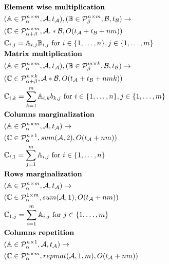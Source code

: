 \begin{figure}
\begin{framed}
\begin{align*}
&\text{{\bf Element wise multiplication}}\\
&(\mathbb{A} \in \mathcal{P}^{n \times m}_\alpha, \mathcal{A}, t_\mathcal{A}), (\mathbb{B} \in \mathcal{P}^{n \times m}_\beta, \mathcal{B}, t_\mathcal{B}) \rightarrow \\ 
&(\mathbb{C} \in \mathcal{P}^{n \times m}_{\alpha + \beta}, \mathcal{A} .* \mathcal{B}, O(t_\mathcal{A} + t_\mathcal{B} + nm)) \\
&\mathbb{C}_{i,j} = \mathbb{A}_{i,j}\mathbb{B}_{i, j} \text{ for } i \in \{1, \dots, n\}, j \in \{1, \dots, m\} \\
&\text{{\bf Matrix multiplication}}\\
&(\mathbb{A} \in \mathcal{P}^{n \times m}_\alpha, \mathcal{A}, t_\mathcal{A}), (\mathbb{B} \in \mathcal{P}^{m \times k}_\beta, \mathcal{B}, t_\mathcal{B}) \rightarrow \\ 
&(\mathbb{C} \in \mathcal{P}^{n \times k}_{\alpha + \beta}, \mathcal{A} * \mathcal{B}, O(t_\mathcal{A} + t_\mathcal{B} + nmk)) \\
&\mathbb{C}_{i,k} = \sum_{k = 1}^m \mathbb{A}_{i,k}b_{k, j} \text{ for } i \in \{1, \dots, n\}, j \in \{1, \dots, m\} \\
&\text{{\bf Columns marginalization}}\\
&(\mathbb{A} \in \mathcal{P}^{n \times m}_\alpha, \mathcal{A}, t_\mathcal{A}) \rightarrow \\ 
&(\mathbb{C} \in \mathcal{P}^{n \times 1}_\alpha, sum(\mathcal{A}, 2), O(t_\mathcal{A} + nm)) \\
&\mathbb{C}_{i, 1} = \sum_{j = 1}^m \mathbb{A}_{i, j} \text{ for } i \in \{1, \dots, n\}\\
&\text{{\bf Rows marginalization}}\\
&(\mathbb{A} \in \mathcal{P}^{n \times m}_\alpha, \mathcal{A}, t_\mathcal{A}) \rightarrow \\ 
&(\mathbb{C} \in \mathcal{P}^{1 \times m}_\alpha, sum(\mathcal{A}, 1), O(t_\mathcal{A} + nm)) \\
&\mathbb{C}_{1, j} = \sum_{i = 1}^m \mathbb{A}_{i, j} \text{ for } j \in \{1, \dots, m\}\\
&\text{{\bf Columns repetition}}\\
&(\mathbb{A} \in \mathcal{P}^{n \times 1}_\alpha, \mathcal{A}, t_\mathcal{A}) \rightarrow \\ 
&(\mathbb{C} \in \mathcal{P}^{n \times m}_\alpha, repmat(\mathcal{A}, 1, m), O(t_\mathcal{A} + nm)) \\

\end{align*}
\end{framed}
\end{figure}
